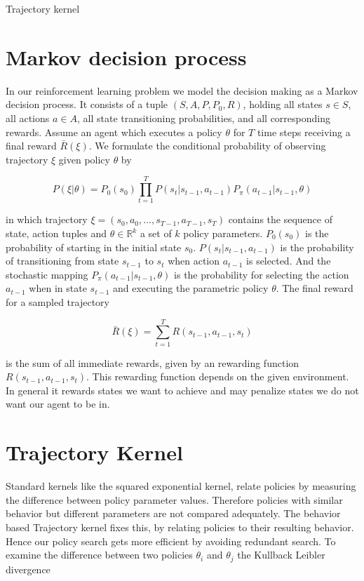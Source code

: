 Trajectory kernel

\section{Markov decision process}
In our reinforcement learning problem we model the decision making as a Markov decision process. It consists of a tuple $(S,A,P,P_{0},R)$, holding all states $s \in S$, all actions $a \in A$, all state transitioning probabilities, and all corresponding rewards. Assume an agent which executes a policy $\theta$ for $T$ time steps receiving a final reward $\bar{R}(\xi)$. We formulate the conditional probability of observing trajectory $\xi$ given policy $\theta$ by

$$P(\xi|\theta) = P_{0}(s_{0}) \prod_{t=1}^{T} P(s_{t}|s_{t-1}, a_{t-1}) P_{\pi}(a_{t-1}|s_{t-1}, \theta)$$

in which trajectory $\xi=(s_{0},a_{0}, ..., s_{T-1}, a_{T-1}, s_{T})$ contains the sequence of state, action tuples and $\theta \in \mathbb{R}^{k}$ a set of $k$ policy parameters. $P_{0}(s_{0})$ is the probability of starting in the initial state $s_{0}$. $P(s_{t}|s_{t-1}, a_{t-1})$ is the probability of transitioning from state $s_{t-1}$ to $s_{t}$ when action $a_{t-1}$ is selected. And the stochastic mapping $P_{\pi}(a_{t-1}|s_{t-1},\theta)$ is the probability for selecting the action $a_{t-1}$ when in state $s_{t-1}$ and executing the parametric policy $\theta$. The final reward for a sampled trajectory

$$\bar{R}(\xi)=\sum_{t=1}^T R(s_{t-1}, a_{t-1}, s_{t})$$

is the sum of all immediate rewards, given by an rewarding function $R(s_{t-1}, a_{t-1}, s_{t})$. This rewarding function depends on the given environment. In general it rewards states we want to achieve and may penalize states we do not want our agent to be in.

\section{Trajectory Kernel}
Standard kernels like the squared exponential kernel, relate policies by measuring the difference between policy parameter values. Therefore policies with similar behavior but different parameters are not compared adequately. The behavior based Trajectory kernel fixes this, by relating policies to their resulting behavior. Hence our policy search gets more efficient by avoiding redundant search. To examine the difference between two policies $\theta_{ i }$ and $\theta_{ j }$ the Kullback Leibler divergence

